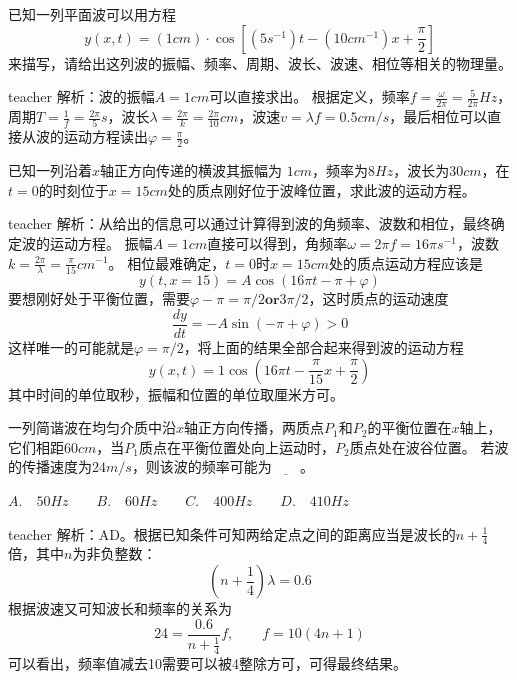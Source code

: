 \begin{example}
已知一列平面波可以用方程
\[y(x,t) = (1\unit{cm})\cdot\cos\left[(5\unit{s^{-1}})t-(10\unit{cm^{-1}}) x+\frac{\pi}{2}\right ]\]
来描写，请给出这列波的振幅、频率、周期、波长、波速、相位等相关的物理量。
\begin{taggedblock}{teacher}
\newline
解析：波的振幅$A = 1cm$可以直接求出。
根据定义，频率$f = \frac{\omega}{2\pi} = \frac{5}{2\pi}\unit{Hz}$，周期$T = \frac{1}{f} = \frac{2\pi}{5}\unit{s}$，波长$\lambda = \frac{2\pi}{k} = \frac{2\pi}{10}\unit{cm}$，波速$v = \lambda f = 0.5\unit{cm/s}$，最后相位可以直接从波的运动方程读出$\varphi = \frac{\pi}{2}$。
\end{taggedblock}
\end{example}


\begin{example}
已知一列沿着$x$轴正方向传递的横波其振幅为 $1\unit{cm}$，频率为$8\unit{Hz}$，波长为$30\unit{cm}$，在$t=0$的时刻位于$x=15\unit{cm}$处的质点刚好位于波峰位置，求此波的运动方程。
\begin{taggedblock}{teacher}
\newline
解析：从给出的信息可以通过计算得到波的角频率、波数和相位，最终确定波的运动方程。
振幅$A = 1\unit{cm}$直接可以得到，角频率$\omega = 2\pi f = 16\pi\unit{s^{-1}}$，波数$k = \frac{2\pi}{\lambda} = \frac{\pi}{15}\unit{cm^{-1}}$。
相位最难确定，$t=0$时$x=15\unit{cm}$处的质点运动方程应该是
\[y(t,x=15) =  A\cos(16\pi t -\pi +\varphi) \]
要想刚好处于平衡位置，需要$\varphi - \pi = \pi/2 \textbf{or} 3\pi/2$，这时质点的运动速度
\[ \frac{dy}{dt} = -A \sin(-\pi+\varphi)>0\]
这样唯一的可能就是$\varphi = \pi/2$，将上面的结果全部合起来得到波的运动方程
\[ y(x,t) = 1\cos(16\pi t - \frac{\pi}{15}x +\frac{\pi}{2})\]
其中时间的单位取秒，振幅和位置的单位取厘米方可。
\end{taggedblock}
\end{example}

\begin{example}
一列简谐波在均匀介质中沿$x$轴正方向传播，两质点$P_1$和$P_2$的平衡位置在$x$轴上，它们相距$60\unit{cm}$，当$P_1$质点在平衡位置处向上运动时，$P_2$质点处在波谷位置。
若波的传播速度为$24\unit{m/s}$，则该波的频率可能为$\underline{\qquad}$。

$A.\quad 50\unit{Hz}\qquad B.\quad 60\unit{Hz}\qquad C.\quad 400\unit{Hz}\qquad D.\quad 410\unit{Hz}$
\begin{taggedblock}{teacher}
\newline
解析：AD。根据已知条件可知两给定点之间的距离应当是波长的$n+\frac{1}{4}$倍，其中$n$为非负整数：
\[   (n+ \frac{1}{4} )\lambda = 0.6 \]
根据波速又可知波长和频率的关系为
\[  24 = \frac{0.6}{n+ \frac{1}{4} }f,\qquad f = 10(4n+1) \]
可以看出，频率值减去10需要可以被4整除方可，可得最终结果。
\end{taggedblock}
\end{example}

